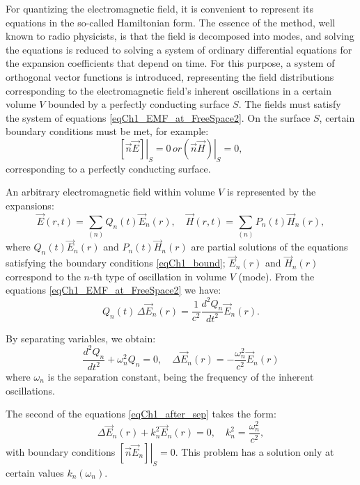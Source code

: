 For quantizing the electromagnetic field, it is convenient to represent its equations in the so-called Hamiltonian form. The essence of the method, well known to radio physicists, is that the field is decomposed into modes, and solving the equations is reduced to solving a system of ordinary differential equations for the expansion coefficients that depend on time. For this purpose, a system of orthogonal vector functions is introduced, representing the field distributions corresponding to the electromagnetic field's inherent oscillations in a certain volume $V$ bounded by a perfectly conducting surface $S$. The fields must satisfy the system of equations \eqref{eqCh1_EMF_at_FreeSpace2}. On the surface $S$, certain boundary conditions must be met, for example:
\begin{equation}
\left. \left[ \vec{n} \vec{E} \right] \right|_S = 0 \,
or
\left. \left( \vec{n} \vec{H} \right) \right|_S = 0,
\label{eqCh1_bound}
\end{equation}
corresponding to a perfectly conducting surface.

An arbitrary electromagnetic field within volume $V$ is represented by the expansions:
\begin{equation}
\vec{E}\left(r, t\right) = \sum_{(n)} Q_n\left(t\right)\vec{E}_n\left(r\right),
\quad
\vec{H}\left(r, t\right) = \sum_{(n)} P_n\left(t\right)\vec{H}_n\left(r\right),
\label{eqCh1_sep0}
\end{equation}
where $Q_n\left(t\right)\vec{E}_n\left(r\right)$ and 
$P_n\left(t\right)\vec{H}_n\left(r\right)$ are partial solutions of the equations satisfying the boundary conditions \eqref{eqCh1_bound}; $\vec{E}_n\left(r\right)$ and  
$\vec{H}_n\left(r\right)$ correspond to the $n$-th type of oscillation in volume $V$ (mode).
From the equations \eqref{eqCh1_EMF_at_FreeSpace2} we have:
\begin{equation}
Q_n\left(t\right) \, \Delta \vec{E}_n\left(r\right) = 
\frac{1}{c^2} \frac{d^2 Q_n}{d t^2}\vec{E}_n\left(r\right). 
\end{equation}

By separating variables, we obtain:
\begin{equation}
\frac{d^2 Q_n}{d t^2} + \omega_n^2 Q_n = 0,
\quad
\Delta \vec{E}_n \left(r\right) = - \frac{\omega_n^2}{c^2} 
\vec{E}_n \left(r\right)
\label{eqCh1_after_sep}
\end{equation}
where $\omega_n$ is the separation constant, being the frequency of the inherent oscillations.

The second of the equations \eqref{eqCh1_after_sep} takes the form:
\begin{equation}
\Delta \vec{E}_n\left(r\right) + k_n^2 \vec{E}_n\left(r\right) = 0,
\quad
k_n^2 = \frac{\omega_n^2}{c^2},
\end{equation}
with boundary conditions  
$\left. \left[ \vec{n} \vec{E}_n \right] \right|_S = 0$. This problem has a solution only at certain values  
$k_n\left(\omega_n\right)$.  

